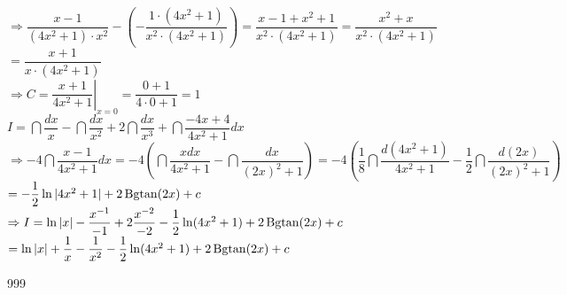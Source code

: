 \documentclass[a4paper]{article}
\begin{document}
$\Rightarrow \dfrac{x - 1}{(4x^2 + 1) \cdot x^2} - \left(- \dfrac{1 \cdot (4x^2 + 1)}{x^2 \cdot (4x^2 + 1)}\right) = \dfrac{x - 1 + x^2 + 1}{x^2 \cdot (4x^2 + 1)} = \dfrac{x^2 + x}{x^2 \cdot (4x^2 + 1)}$\\

$= \dfrac{x + 1}{x \cdot (4x^2 + 1)}$\\

$\Rightarrow C = \left. \dfrac{x + 1}{4x^2 + 1}\right|_{x=0} = \dfrac{0 + 1}{4 \cdot 0 + 1} = 1$\\

$I = \dint \dfrac{dx}{x} - \dint \dfrac{dx}{x^2} + 2\dint \dfrac{dx}{x^3} + \dint \dfrac{-4x + 4}{4x^2 + 1} dx$\\

$\Rightarrow -4\dint \dfrac{x - 1}{4x^2 + 1}dx = -4 \left(\dint \dfrac{xdx}{4x^2 + 1} - \dint \dfrac{dx}{(2x)^2 + 1}\right) = -4 \left(\dfrac{1}{8}\dint \dfrac{d(4x^2 + 1)}{4x^2 + 1} - \dfrac{1}{2}\dint \dfrac{d(2x)}{(2x)^2 + 1}\right)$\\

$= -\dfrac{1}{2}\ln |4x^2 + 1| + 2 \operatorname{Bgtan} (2x) + c$\\

$\Rightarrow I = \ln |x| - \dfrac{x^{-1}}{-1} + 2\dfrac{x^{-2}}{-2} - \dfrac{1}{2} \ln (4x^2 + 1) + 2 \operatorname{Bgtan} (2x) + c$\\

$= \ln |x| + \dfrac{1}{x} - \dfrac{1}{x^2} - \dfrac{1}{2} \ln (4x^2 + 1) + 2 \operatorname{Bgtan} (2x) + c$\\

\begin{thebibliography}{999}
\end{thebibliography}
\end{document}
